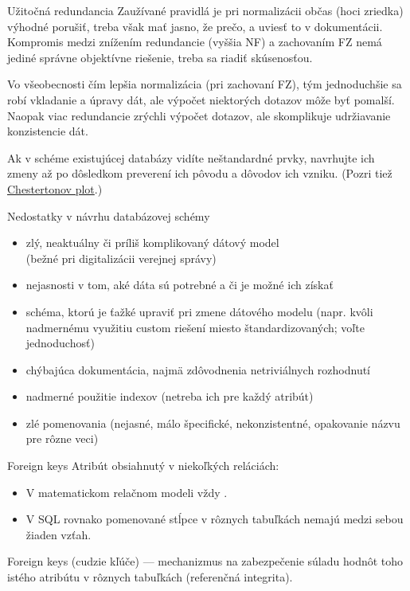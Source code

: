 \documentclass[12pt]{beamer}
\begin{document}
\begin{frame}{Užitočná redundancia}
Zaužívané pravidlá je pri normalizácii občas (hoci zriedka) výhodné porušiť,
treba však mať jasno, že prečo, a uviesť to v dokumentácii.
Kompromis medzi znížením redundancie (vyššia NF) a zachovaním FZ nemá
jediné správne objektívne riešenie, treba sa riadiť skúsenosťou.
\bigskip

Vo všeobecnosti čím lepšia normalizácia (pri zachovaní FZ),
tým jednoduchšie sa robí vkladanie a úpravy dát, ale výpočet niektorých dotazov môže byť pomalší.
Naopak viac redundancie zrýchli výpočet dotazov, ale skomplikuje udržiavanie konzistencie dát.

Ak v schéme existujúcej databázy vidíte neštandardné prvky,
navrhujte ich zmeny až po dôsledkom preverení ich pôvodu a dôvodov ich vzniku.
(Pozri tiež \href{https://fs.blog/chestertons-fence/}{Chestertonov plot}.)
\end{frame}

\begin{frame}[fragile]{Nedostatky v návrhu databázovej schémy}
\begin{itemize}
\item zlý, neaktuálny či príliš komplikovaný dátový model\\ (bežné pri digitalizácii verejnej správy)
\item nejasnosti v tom, aké dáta sú potrebné a či je možné ich získať
\item schéma, ktorú je ťažké upraviť pri zmene dátového modelu
      (napr. kvôli nadmernému využitiu custom riešení miesto štandardizovaných; voľte jednoduchosť)
\item chýbajúca dokumentácia, najmä zdôvodnenia netriviálnych rozhodnutí
\item nadmerné použitie indexov (netreba ich  pre každý atribút)
\item zlé pomenovania (nejasné, málo špecifické, nekonzistentné, opakovanie názvu pre rôzne veci)
\end{itemize}
\end{frame}


\begin{frame}[fragile]{Foreign keys}
Atribút obsiahnutý v niekoľkých reláciách:
\begin{itemize}
\item V matematickom relačnom modeli vždy .
\item V SQL rovnako pomenované stĺpce v rôznych tabuľkách nemajú medzi sebou žiaden vzťah.
\end{itemize}
\alert{Foreign keys} (cudzie kľúče) --- mechanizmus na zabezpečenie súladu hodnôt toho istého atribútu v rôznych tabuľkách (referenčná integrita).
\end{frame}
\end{document}
